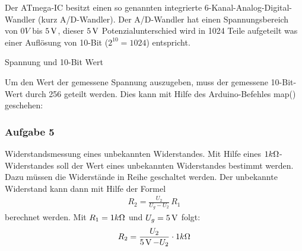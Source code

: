 Der ATmega-IC besitzt einen so genannten integrierte 6-Kanal-Analog-Digital-Wandler (kurz A/D-Wandler). Der A/D-Wandler hat einen Spannungsbereich von $0V$ bis $5\operatorname{V}$, dieser $5\operatorname{V}$ Potenzialunterschied wird in 1024 Teile aufgeteilt was einer Auflösung von 10-Bit ($2^{10} = 1024$) entspricht. 


\begin{table}[h]

\begin{center}


\end{center}
\caption{Spannung und 10-Bit Wert }
\label{tab:spannung-10-bit}
\end{table}%

Um den Wert der gemessene Spannung auszugeben, muss der gemessene 10-Bit-Wert durch 256 geteilt werden. Dies kann mit Hilfe des Arduino-Befehles map() geschehen:

\subsubsection{Aufgabe 5}
Widerstandsmessung eines unbekannten Widerstandes. Mit Hilfe eines $1k\Omega$-Widerstandes soll der Wert eines unbekannten Widerstandes bestimmt werden. Dazu müssen die Widerstände in Reihe geschaltet werden. Der unbekannte Widerstand kann dann mit Hilfe der Formel
\begin{eqnarray*}
  R_2 = \frac{U_2}{U_g-U_2}\,R_1
\end{eqnarray*}
berechnet werden. Mit $R_1=1k\Omega$ und $U_g=5\operatorname{V}$ folgt:
\begin{eqnarray*}
  R_2 = \frac{U_2}{5\operatorname{V}-U_2}\cdot 1k\Omega
\end{eqnarray*}
 


